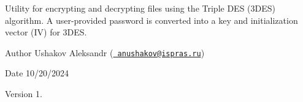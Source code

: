 Utility for encrypting and decrypting files using the Triple DES (3DES) algorithm. A user-\/provided password is converted into a key and initialization vector (IV) for 3DES.

\begin{DoxyAuthor}{Author}
Ushakov Aleksandr (\href{mailto:anushakov@ispras.ru}{\texttt{ anushakov@ispras.\+ru}}) 
\end{DoxyAuthor}
\begin{DoxyDate}{Date}
10/20/2024 
\end{DoxyDate}
\begin{DoxyVersion}{Version}
1. 
\end{DoxyVersion}
